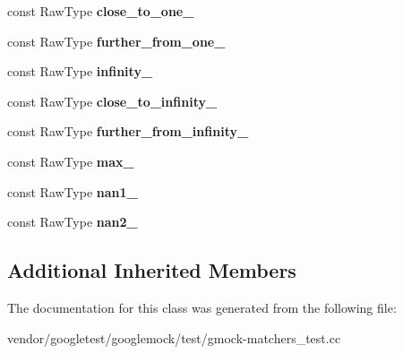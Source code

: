 \begin{DoxyCompactItemize}
const Raw\+Type {\bfseries close\+\_\+to\+\_\+one\+\_\+}
\item 
\mbox{\label{classtesting_1_1gmock__matchers__test_1_1_floating_point_test_a049ba2d5d371e8aea6ada1ab5312b1bb}} 
const Raw\+Type {\bfseries further\+\_\+from\+\_\+one\+\_\+}
\item 
\mbox{\label{classtesting_1_1gmock__matchers__test_1_1_floating_point_test_a21d8a019a6365ddff80e301a6163f43f}} 
const Raw\+Type {\bfseries infinity\+\_\+}
\item 
\mbox{\label{classtesting_1_1gmock__matchers__test_1_1_floating_point_test_a6fc8ac2030f4883e1c84da3a21bbb7c3}} 
const Raw\+Type {\bfseries close\+\_\+to\+\_\+infinity\+\_\+}
\item 
\mbox{\label{classtesting_1_1gmock__matchers__test_1_1_floating_point_test_a603ab51280ecb1c4147c2660a7a90728}} 
const Raw\+Type {\bfseries further\+\_\+from\+\_\+infinity\+\_\+}
\item 
\mbox{\label{classtesting_1_1gmock__matchers__test_1_1_floating_point_test_a17b9dd56136b64fa7210bfe024d88c30}} 
const Raw\+Type {\bfseries max\+\_\+}
\item 
\mbox{\label{classtesting_1_1gmock__matchers__test_1_1_floating_point_test_a0d2544956414eac21d4519fe600e4603}} 
const Raw\+Type {\bfseries nan1\+\_\+}
\item 
\mbox{\label{classtesting_1_1gmock__matchers__test_1_1_floating_point_test_a4af3b3e53a06d271479ff30f5d5ee155}} 
const Raw\+Type {\bfseries nan2\+\_\+}
\end{DoxyCompactItemize}
\subsection*{Additional Inherited Members}


The documentation for this class was generated from the following file\+:\begin{DoxyCompactItemize}
\item 
vendor/googletest/googlemock/test/gmock-\/matchers\+\_\+test.\+cc\end{DoxyCompactItemize}

